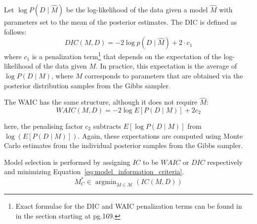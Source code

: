 \documentclass[letterpaper]{article}
\newcommand{\citename}[1]{\citeauthor{#1}~\shortcite{#1}}
\DeclareMathOperator{\argmin}{argmin}
\begin{document}
Let $ \log P( D \mid \hat{M} )$ be the log-likelihood of the data given a model $\hat{M}$ with parameters set to the mean of the posterior estimates. The DIC is defined as follows:
\begin{equation}
\label{eq:dic_formula}
DIC (M, D) = -2 \log p(D \mid \hat{M}) + 2\cdot c_1
\end{equation}
where $c_1$ is a penalization term\footnote{Exact formulae for the DIC and WAIC penalization terms can be found in \citename{gelman2013bayesian} in the section starting at pg.169.} that depends on
the expectation of the log-likelihood of the data given $M$.  In practice, this expectation is the average of $\log P(D\mid M)$, where $M$ corresponds to parameters that are obtained via the posterior distribution samples from the Gibbs sampler.

The WAIC has the same structure, although it does not require $\hat{M}$:
\begin{equation}
\label{eq:waic_formula}
WAIC (M ,D) = - 2 \log E[ P( D \mid M ) ] + 2c_2
\end{equation}

\noindent here, the penalising factor $c_2$
subtracts $E[ \log P (D \mid M )]$ from $\log\left( E[ P ( D \mid M )]\right)$.
Again, these expectations are computed using Monte Carlo estimates from the individual posterior samples from the Gibbs sampler.

Model selection is performed by assigning $IC$ to be $WAIC$ or $DIC$ respectively and minimizing Equation~\ref{eq:model_information_criteria}.
\begin{equation}
\label{eq:model_information_criteria}
M^*_C \in \argmin_{M \in \mathcal{M}}(IC(M, D))
\end{equation}
\end{document}
